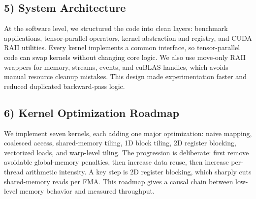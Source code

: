 \documentclass[11pt]{article}
\begin{document}

\subsection*{5) System Architecture}
At the software level, we structured the code into clean layers: benchmark applications, tensor-parallel operators, kernel abstraction and registry, and CUDA RAII utilities. Every kernel implements a common interface, so tensor-parallel code can swap kernels without changing core logic. We also use move-only RAII wrappers for memory, streams, events, and cuBLAS handles, which avoids manual resource cleanup mistakes. This design made experimentation faster and reduced duplicated backward-pass logic.

\subsection*{6) Kernel Optimization Roadmap}
We implement seven kernels, each adding one major optimization: naive mapping, coalesced access, shared-memory tiling, 1D block tiling, 2D register blocking, vectorized loads, and warp-level tiling. The progression is deliberate: first remove avoidable global-memory penalties, then increase data reuse, then increase per-thread arithmetic intensity. A key step is 2D register blocking, which sharply cuts shared-memory reads per FMA. This roadmap gives a causal chain between low-level memory behavior and measured throughput.

\end{document}
